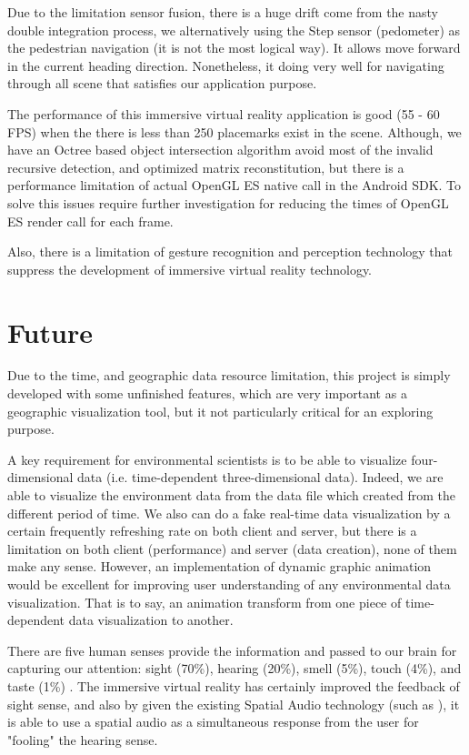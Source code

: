 Due to the limitation sensor fusion, there is a huge drift come from the nasty double integration process, we alternatively using the Step sensor (pedometer) as the pedestrian navigation (it is not the most logical way). It allows move forward in the current heading direction. Nonetheless, it doing very well for navigating through all scene that satisfies our application purpose.

The performance of this immersive virtual reality application is good (55 - 60 FPS) when the there is less than 250 placemarks exist in the scene. Although, we have an Octree based object intersection algorithm avoid most of the invalid recursive detection, and optimized matrix reconstitution, but there is a performance limitation of actual OpenGL ES native call in the Android SDK. To solve this issues require further investigation for reducing the times of OpenGL ES render call for each frame. 

Also, there is a limitation of gesture recognition and perception technology that suppress the development of immersive virtual reality technology.

\section{Future}

Due to the time, and geographic data resource limitation, this project is simply developed with some unfinished features, which are very important as a geographic visualization tool, but it not particularly critical for an exploring purpose.

A key requirement for environmental scientists is to be able to visualize four-dimensional data (i.e. time-dependent three-dimensional data). Indeed, we are able to visualize the environment data from the data file which created from the different period of time. We also can do a fake real-time data visualization by a certain frequently refreshing rate on both client and server, but there is a limitation on both client (performance) and server (data creation), none of them make any sense. However, an implementation of dynamic graphic animation would be excellent for improving user understanding of any environmental data visualization. That is to say, an animation transform from one piece of time-dependent data visualization to another.

There are five human senses provide the information and passed to our brain for capturing our attention: sight (70\%), hearing (20\%), smell (5\%), touch (4\%), and taste (1\%) \cite{mazuryk.vr.1996}. The immersive virtual reality has certainly improved the feedback of sight sense, and also by given the existing Spatial Audio technology (such as \cite{google.spatial-audio.2016}), it is able to use a spatial audio as a simultaneous response from the user for "fooling" the hearing sense.

